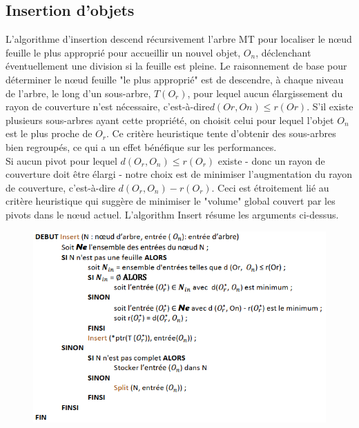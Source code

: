 \subsection{Insertion d'objets}
L'algorithme d'insertion descend récursivement l'arbre MT pour localiser le nœud feuille le plus approprié pour accueillir un nouvel objet, $ O_n $, déclenchant éventuellement une division si la feuille est pleine. Le raisonnement de base pour déterminer le nœud feuille "le plus approprié" est de descendre, à chaque niveau de l'arbre, le long d'un sous-arbre, $ T(O_r) $, pour lequel aucun élargissement du rayon de couverture n'est nécessaire, c'est-à-dire$  d(Or, On) \le r(Or) $. S'il existe plusieurs sous-arbres ayant cette propriété, on choisit celui pour lequel l'objet $ O_n $ est le plus proche de $ O_r $. Ce critère heuristique tente d'obtenir des sous-arbres bien regroupés, ce qui a un effet bénéfique sur les performances.\\

Si aucun pivot pour lequel $ d(O_r, O_n) \le r(O_r) $ existe - donc un rayon de couverture doit être élargi - notre choix est de minimiser l'augmentation du rayon de couverture, c'est-à-dire $ d(O_r, O_n)-r(O_r) $. Ceci est étroitement lié au critère heuristique qui suggère de minimiser le "volume" global couvert par les pivots dans le nœud actuel. L'algorithm Insert résume les arguments ci-dessus.
\begin{figure}[H]
	\centering
	\includegraphics[width=.9 \textwidth]{Figures/insert.png} %
\end{figure} 

%
%
%
%
